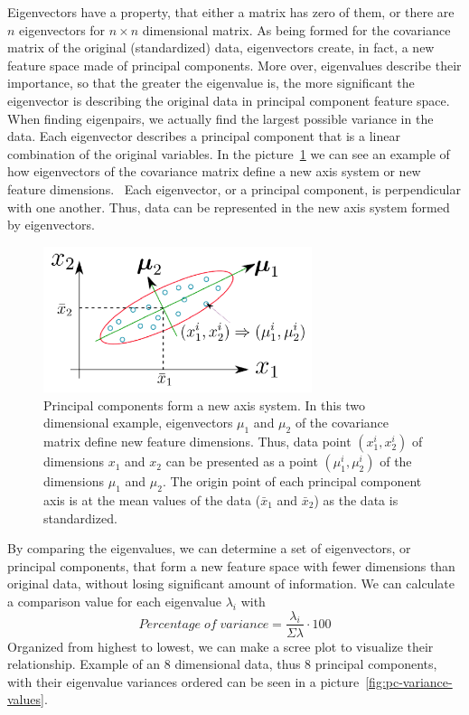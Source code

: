 Eigenvectors have a property,
that either a matrix has zero of them,
or there are $n$ eigenvectors for $n\times n$ dimensional matrix.
As being formed for the covariance matrix of the original (standardized) data,
eigenvectors create,
in fact,
a new feature space made of principal components.
More over,
eigenvalues describe their importance,
so that the greater the eigenvalue is,
the more significant the eigenvector is describing the original data
in principal component feature space.
When finding eigenpairs,
we actually find the largest possible variance in the data.
Each eigenvector describes a principal component
that is a linear combination of the original variables.
In the picture~\ref{fig:pca-example} we can see an example of
how eigenvectors of the covariance matrix define a new axis system
or new feature dimensions.~\cite{zhu2019dimension}
Each eigenvector, or a principal component,
is perpendicular with one another.
Thus, data can be represented
in the new axis system formed by eigenvectors.

\begin{figure}[htb]
    \centering
    \includegraphics[width=0.7\textwidth]{./appendices/pca-example}
    \caption{Principal components form a new axis system.
    In this two dimensional example,
        eigenvectors $\mu_{1}$ and $\mu_{2}$ of the covariance matrix
        define new feature dimensions.
        Thus, data point $(x_{1}^{i},x_{2}^{i})$ of dimensions $x_{1}$ and $x_{2}$
        can be presented as a point $(\mu_{1}^{i},\mu_{2}^{i})$ of the dimensions $\mu_{1}$ and $\mu_{2}$.
        The origin point of each principal component axis is at the mean values of the data ($\bar{x}_{1}$ and $\bar{x}_{2}$)
        as the data is standardized.
        ~\cite{zhu2019dimension}
        \label{fig:pca-example}}
\end{figure}

By comparing the eigenvalues,
we can determine a set of eigenvectors,
or principal components,
that form a new feature space with fewer dimensions than original data,
without losing significant amount of information.
We can calculate a comparison value for each eigenvalue $\lambda_{i}$ with
\begin{equation}
    Percentage\; of\; variance = \frac{\lambda_{i}}{\Sigma\lambda}\cdot100
\end{equation}
Organized from highest to lowest,
we can make a scree plot to visualize their relationship.
Example of an 8 dimensional data,
thus 8 principal components,
with their eigenvalue variances ordered
can be seen in a picture~\ref{fig:pc-variance-values}.

